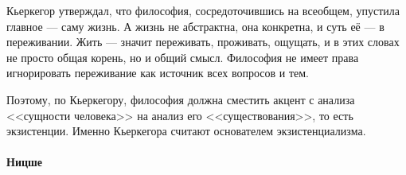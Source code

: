 Кьеркегор утверждал, что философия, сосредоточившись на всеобщем, упустила главное --- саму жизнь. А жизнь не абстрактна, она конкретна, и суть её --- в переживании. Жить --- значит переживать, проживать, ощущать, и в этих словах не просто общая корень, но и общий смысл. Философия не имеет права игнорировать переживание как источник всех вопросов и тем.

Поэтому, по Кьеркегору, философия должна сместить акцент с анализа <<сущности человека>> на анализ его <<существования>>, то есть экзистенции. Именно Кьеркегора считают основателем экзистенциализма.

\paragraph{Ницше}
